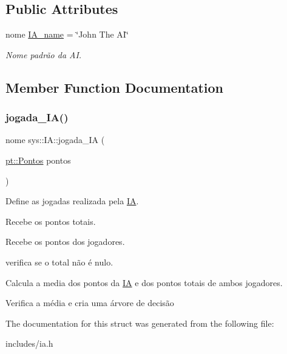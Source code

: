 \subsection*{Public Attributes}
\begin{DoxyCompactItemize}
\item 
\mbox{\label{structsys_1_1IA_a9e6ef99030d8377bfd2959912bada321}} 
nome \hyperlink{structsys_1_1IA_a9e6ef99030d8377bfd2959912bada321}{I\+A\+\_\+name} = \char`\"{}John The AI\char`\"{}
\begin{DoxyCompactList}\small\item\em Nome padrão da AI. \end{DoxyCompactList}\end{DoxyCompactItemize}


\subsection{Member Function Documentation}
\mbox{\label{structsys_1_1IA_af66b1ac3ef1fe1772893a389e26e9cdc}} 
\subsubsection{\texorpdfstring{jogada\+\_\+\+I\+A()}{jogada\_IA()}}
{\footnotesize\ttfamily nome sys\+::\+I\+A\+::jogada\+\_\+\+IA (\begin{DoxyParamCaption}\item[{\hyperlink{structpt_1_1Pontos}{pt\+::\+Pontos}}]{pontos }\end{DoxyParamCaption})\hspace{0.3cm}{\ttfamily [inline]}}



Define as jogadas realizada pela \hyperlink{structsys_1_1IA}{IA}. 

Recebe os pontos totais.

Recebe os pontos dos jogadores.

verifica se o total não é nulo.

Calcula a media dos pontos da \hyperlink{structsys_1_1IA}{IA} e dos pontos totais de ambos jogadores.

Verifica a média e cria uma árvore de decisão 

The documentation for this struct was generated from the following file\+:\begin{DoxyCompactItemize}
\item 
includes/ia.\+h\end{DoxyCompactItemize}
